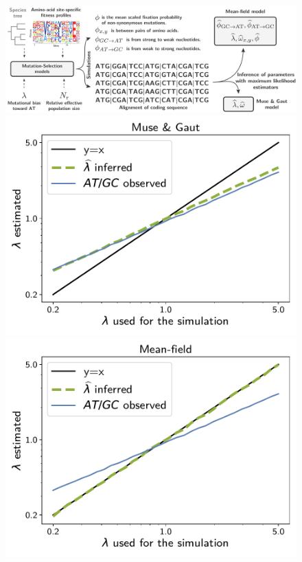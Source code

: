 \documentclass{article}
\begin{document}
\begin{figure}[!htb]
 \centering
 \includegraphics[width=\textwidth, page=1] {pipeline}
 \begin{minipage}{0.325\linewidth}
 \includegraphics[width=\linewidth, page=1]{inference_simulations/lambda_MG}
 \end{minipage}
 \hfill
 \begin{minipage}{0.325\linewidth}
 \includegraphics[width=\linewidth, page=1]{inference_simulations/lambda_MF}

\end{minipage}
\end{figure}
\end{document}
